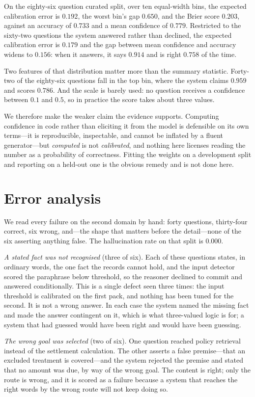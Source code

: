 \documentclass[11pt]{article}
\begin{document}
On the eighty-six question curated split, over ten equal-width bins, the expected
calibration error is $0.192$, the worst bin's gap $0.650$, and the Brier score $0.203$,
against an accuracy of $0.733$ and a mean confidence of $0.779$. Restricted to the
sixty-two questions the system answered rather than declined, the expected calibration
error is $0.179$ and the gap between mean confidence and accuracy widens to $0.156$: when
it answers, it says $0.914$ and is right $0.758$ of the time.

Two features of that distribution matter more than the summary statistic. Forty-two of
the eighty-six questions fall in the top bin, where the system claims $0.959$ and scores
$0.786$. And the scale is barely used: no question receives a confidence between $0.1$ and
$0.5$, so in practice the score takes about three values.

We therefore make the weaker claim the evidence supports. Computing confidence in code
rather than eliciting it from the model is defensible on its own terms---it is
reproducible, inspectable, and cannot be inflated by a fluent generator---but
\emph{computed} is not \emph{calibrated}, and nothing here licenses reading the number as
a probability of correctness. Fitting the weights on a development split and reporting on
a held-out one is the obvious remedy and is not done here.

\section{Error analysis}\label{sec:errors}
We read every failure on the second domain by hand: forty questions, thirty-four correct,
six wrong, and---the shape that matters before the detail---none of the six asserting
anything false. The hallucination rate on that split is $0.000$.

\emph{A stated fact was not recognised} (three of six). Each of these questions states, in
ordinary words, the one fact the records cannot hold, and the input detector scored the
paraphrase below threshold, so the reasoner declined to commit and answered conditionally.
This is a single defect seen three times: the input threshold is calibrated on the first
pack, and nothing has been tuned for the second. It is not a wrong answer. In each case
the system named the missing fact and made the answer contingent on it, which is what
three-valued logic is for; a system that had guessed would have been right and would have
been guessing.

\emph{The wrong goal was selected} (two of six). One question reached policy retrieval
instead of the settlement calculation. The other asserts a false premise---that an
excluded treatment is covered---and the system rejected the premise and stated that no
amount was due, by way of the wrong goal. The content is right; only the route is wrong,
and it is scored as a failure because a system that reaches the right words by the wrong
route will not keep doing so.
\end{document}
